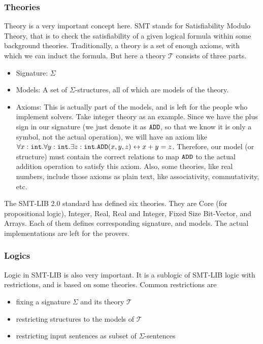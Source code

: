 \documentclass[10pt,letter]{article}
\theoremstyle{definition}
\begin{document}
\subsubsection{Theories}
Theory is a very important concept here. SMT stands for Satisfiability Modulo Theory, that is to check the satisfiability of a given logical formula within some background theories. Traditionally, a theory is a set of enough axioms, with which we can induct the formula. But here a theory $\mathcal{T}$ consists of three parts.
\begin{itemize}
\item Signature: $\Sigma$
\item Models: A set of $\Sigma$-structures, all of which are models of the theory.
\item Axioms: This is actually part of the models, and is left for the people who implement solvers. Take integer theory as an example. Since we have the plus sign in our signature (we just denote it as $\tt ADD$, so that we know it is only a symbol, not the actual operation), we will have an axiom like $\forall x:{\tt int}.\forall y:{\tt int}. \exists z:{\tt int}. {\tt ADD}(x,y,z) \leftrightarrow x + y = z$. Therefore, our model (or structure) must contain the correct relations to map $\tt ADD$ to the actual addition operation to satisfy this axiom. Also, some theories, like real numbers, include those axioms as plain text, like associativity, commutativity, etc.

\end{itemize}

The SMT-LIB 2.0 standard has defined six theories. They are Core (for propositional logic), Integer, Real, Real and Integer, Fixed Size Bit-Vector, and Arrays. Each of them defines corresponding signature, and models. The actual implementations are left for the provers.

\subsubsection{Logics}
Logic in SMT-LIB is also very important. It is a sublogic of SMT-LIB logic with restrictions, and is based on some theories. Common restrictions are
\begin{itemize}
\item fixing a signature $\Sigma$ and its theory $\mathcal{T}$
\item restricting structures to the models of $\mathcal{T}$
\item restricting input sentences as subset of $\Sigma$-sentences
\end{itemize}
\end{document}
